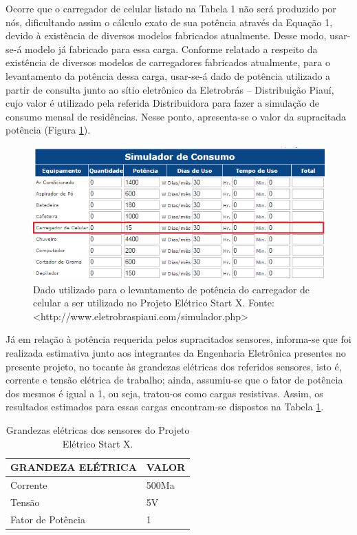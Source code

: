 Ocorre que o carregador de celular listado na Tabela 1 não será produzido por nós, dificultando assim o cálculo exato de sua potência através da Equação 1, devido à existência de diversos modelos fabricados atualmente. Desse modo, usar-se-á modelo já fabricado para essa carga. Conforme relatado a respeito da existência de diversos modelos de carregadores fabricados atualmente, para o levantamento da potência dessa carga, usar-se-á dado de potência utilizado a partir de consulta junto ao sítio eletrônico da Eletrobrás – Distribuição Piauí, cujo valor é utilizado pela referida Distribuidora para fazer a simulação de consumo mensal de residências. Nesse ponto, apresenta-se o valor da supracitada potência (Figura \ref{levantamento-de-potencias}).

\begin{figure}[h]
	\centering
	\includegraphics[scale= 0.8]{figuras/simulador-potencias.png}
	\caption{Dado utilizado para o levantamento de potência do carregador de celular a ser utilizado no Projeto Elétrico Start X. Fonte: <http://www.eletrobraspiaui.com/simulador.php>}
	\label{levantamento-de-potencias}
\end{figure}

Já em relação à potência requerida pelos supracitados sensores, informa-se que foi realizada estimativa junto aos integrantes da Engenharia Eletrônica presentes no presente projeto, no tocante às grandezas elétricas dos referidos sensores, isto é, corrente e tensão elétrica de trabalho; ainda, assumiu-se que o fator de potência dos mesmos é igual a 1, ou seja, tratou-os como cargas resistivas. Assim, os resultados estimados para essas cargas encontram-se dispostos na Tabela \ref{grandezas-eletricas}.

\begin{table}[h]
\centering
\begin{tabular}{|l|l|}
\hline
\rowcolor[HTML]{329A9D} 
GRANDEZA ELÉTRICA & VALOR                                            \\ \hline
Corrente                                                    & 500Ma 
\\ \hline
Tensão                                                      & 5V
\\ \hline
Fator de Potência & 1                                                \\ \hline
\end{tabular}
\caption{Grandezas elétricas dos sensores do Projeto Elétrico Start X.}
\label{grandezas-eletricas}
\end{table}

